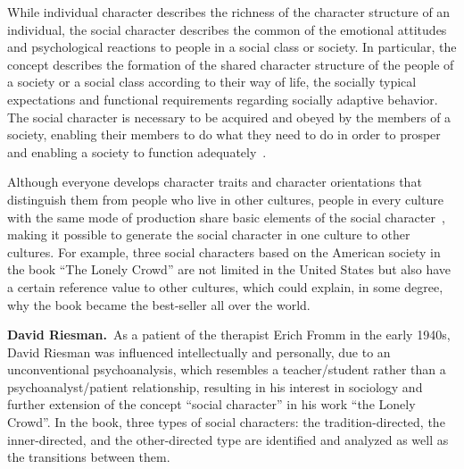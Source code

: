 While individual character describes the richness of the character structure of an individual, the social character describes the common of the emotional attitudes and psychological reactions to people in a social class or society. In particular, the concept describes the formation of the shared character structure of the people of a society or a social class according to their way of life, the socially typical expectations and functional requirements regarding socially adaptive behavior. The social character is necessary to be acquired and obeyed by the members of a society, enabling their members to do what they need to do in order to prosper and enabling a society to function adequately~\citep{fromm1941escape, fromm1994escape}.

Although everyone develops character traits and character orientations that distinguish them from people who live in other cultures, people in every culture with the same mode of production share basic elements of the social character~\citep{fromm1970social}, making it possible to generate the social character in one culture to other cultures. For example, three social characters based on the American society in the book ``The Lonely Crowd'' are not limited in the United States but also have a certain reference value to other cultures, which could explain, in some degree, why the book became the best-seller all over the world.

\textbf{David Riesman.}~As a patient of the therapist Erich Fromm in the early 1940s, David Riesman was influenced intellectually and personally, due to an unconventional psychoanalysis, which resembles a teacher/student rather than a psychoanalyst/patient relationship, resulting in his interest in sociology and further extension of the concept ``social character'' in his work ``the Lonely Crowd''. In the book, three types of social characters: the tradition-directed, the inner-directed, and the other-directed type are identified and analyzed as well as the transitions between them.


